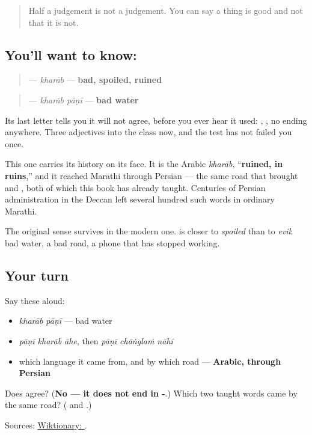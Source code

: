 \begin{quote}
Half a judgement is not a judgement. You can say a thing is good and not that it is not.
\end{quote}

\subsection*{You'll want to know: }
\begin{quote}
\textbf{} — \emph{kharāb} — \textbf{bad, spoiled, ruined}
\end{quote}

\begin{quote}
\textbf{ } — \emph{kharāb pāṇī} — \textbf{bad water}
\end{quote}

Its last letter tells you it will not agree, before you ever hear it used: \textbf{ }, \textbf{ }, no ending anywhere. Three adjectives into the class now, and the test has not failed you once.

This one carries its history on its face. It is the Arabic \emph{kharāb}, \textquotedblleft{}\textbf{ruined, in ruins},\textquotedblright{} and it reached Marathi through Persian — the same road that brought \textbf{} and \textbf{}, both of which this book has already taught. Centuries of Persian administration in the Deccan left several hundred such words in ordinary Marathi.

The original sense survives in the modern one. \textbf{} is closer to \emph{spoiled} than to \emph{evil}: bad water, a bad road, a phone that has stopped working.

\subsection*{Your turn}
Say these aloud:

\begin{itemize}
\raggedright
  \item \emph{kharāb pāṇī} — bad water
  \item \emph{pāṇī kharāb āhe}, then \emph{pāṇī chāṅglaṁ nāhī}
  \item which language it came from, and by which road — \textbf{Arabic, through Persian}
\end{itemize}

\begin{tcolorbox}[breakable,colback=teal!4,colframe=teal!35!black,title={Before you move on}]
Does \textbf{} agree? (\textbf{No — it does not end in -}.) Which two taught words came by the same road? (\textbf{} and \textbf{}.)

Sources: \href{https://en.wiktionary.org/wiki/\%E0\%A4\%96\%E0\%A4\%B0\%E0\%A4\%BE\%E0\%A4\%AC}{Wiktionary: }.
\end{tcolorbox}
